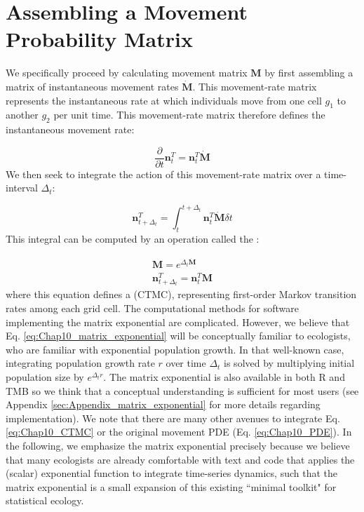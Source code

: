 \section{Assembling a Movement Probability Matrix} \label{sec:Chap10_assembling_movement_matrix}

We specifically proceed by calculating movement matrix \( \mathbf M \) by first assembling a matrix of instantaneous movement rates \( \dot{\mathbf{M}} \).  This movement-rate matrix represents the instantaneous rate at which individuals move from one cell \( g_1 \) to another \( g_2 \) per unit time.  This movement-rate matrix therefore defines the instantaneous movement rate:

\begin{equation} \label{eq:Chap10_CTMC}
    \frac{\partial}{\partial t} \mathbf{n}_t^T = \mathbf{n}_t^T \dot{\mathbf{M}} 
\end{equation}
We then seek to integrate the action of this movement-rate matrix over a time-interval \( \Delta_t \):  

\begin{equation}
    \mathbf{n}_{t+\Delta_t}^T = \int_t^{t+\Delta_t} \mathbf{n}_t^T \dot{\mathbf{M}}  \delta t
\end{equation}
This integral can be computed by an operation called the :

\begin{equation} \label{eq:Chap10_matrix_exponential}
\begin{gathered}
    \mathbf{M} = e^{\Delta_t \dot{\mathbf{M}}} \\
    \mathbf{n}_{t+\Delta_t}^T = \mathbf{n}_t^T \mathbf{M}  
\end{gathered}
\end{equation}
where this equation defines a  (CTMC)\cite{hanks_continuous-time_2015}, representing first-order Markov transition rates among each grid cell.  The computational methods for software implementing the matrix exponential are complicated.  However, we believe that Eq. \ref{eq:Chap10_matrix_exponential} will be conceptually familiar to ecologists, who are familiar with exponential population growth.  In that well-known case, integrating population growth rate \(r\) over time \(\Delta_t\) is solved by multiplying initial population size by \(e^{\Delta_t r}\). The matrix exponential is also available in both R and TMB so we think that a conceptual understanding is sufficient for most users (see Appendix \ref{sec:Appendix_matrix_exponential} for more details regarding implementation).  We note that there are many other avenues to integrate Eq. \ref{eq:Chap10_CTMC} or the original movement PDE (Eq. \ref{eq:Chap10_PDE}).  In the following, we emphasize the matrix exponential precisely because we believe that many ecologists are already comfortable with text and code that applies the (scalar) exponential function to integrate time-series dynamics, such that the matrix exponential is a small expansion of this existing ``minimal toolkit" for statistical ecology.   


